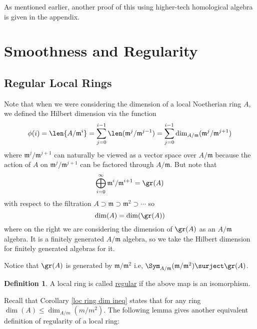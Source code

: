 \documentclass[12 pt]{article}
\theoremstyle{definition}
\newtheorem{defn}[thm]{Definition}
\renewcommand{\(}{\left(}
\renewcommand{\)}{\right)}
\newcommand\fm{{\mathfrak m}}
\begin{document}
As mentioned earlier, another proof of this using higher-tech homological algebra is given in the appendix.




\newpage



\section{Smoothness and Regularity}

\subsection{Regular Local Rings}


Note that when we were considering the dimension of a local Noetherian ring $A$, we defined the Hilbert dimension via the function
\[\phi(i)=\len{A/\fm^i}=\sum_{j=0}^{i-1}\len(\fm^j/\fm^{j-1})=\sum_{j=0}^{i-1}\dim_{A/\fm}(\fm^j/\fm^{j+1})\]
where $\fm^j/\fm^{j+1}$ can naturally be viewed as a vector space over $A/\fm$ because the action of $A$ on $\fm^j/\fm^{j+1}$ can be factored through $A/\fm$. But note that
\[\bigoplus_{i=0}^\infty \fm^i/\fm^{i+1}=\gr(A)\]
with respect to the filtration $A \supset \fm \supset \fm^2 \supset \cdots$ so
\[\dim(A)=\dim(\gr(A))\]
where on the right we are considering the dimension of $\gr(A)$ as an $A/\fm$ algebra. It is a finitely generated $A/\fm$ algebra, so we take the Hilbert dimension for finitely generated algebras for it.

Notice that $\gr(A)$ is generated by $\fm/\fm^2$ i.e, $\Sym_{A/\fm}(\fm/\fm^2) \surject \gr(A)$.

\begin{defn} A local ring is called \underline{regular} if the above map is an isomorphism.
\end{defn}

Recall that Corollary \ref{loc ring dim ineq} states that for any ring $\dim(A) \leq \dim_{A/m}(m/m^2)$. The following lemma gives another equivalent definition of regularity of a local ring:
\end{document}
